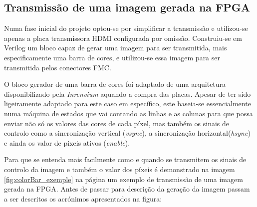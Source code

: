 \subsection{Transmissão de uma imagem gerada na FPGA} \label{subsub:planA}

Numa fase inicial do projeto optou-se por simplificar a transmissão e utilizou-se apenas a placa transmissora HDMI configurada por omissão. Construiu-se em Verilog um bloco capaz de gerar uma imagem para ser transmitida, mais especificamente uma barra de cores, e utilizou-se essa imagem para ser transmitida pelos conectores FMC.

O bloco gerador de uma barra de cores foi adaptado de uma arquitetura disponibilizado pela \textit{Inrenvium} aquando a compra das placas. Apesar de ter sido ligeiramente adaptado para este caso em específico, este baseia-se essencialmente numa máquina de estados que vai contando as linhas e as colunas para que possa enviar não só os valores das cores de cada píxel, mas também os sinais de controlo como a sincronização vertical (\textit{vsync}), a sincronização horizontal(\textit{hsync}) e ainda os valor de pixeis ativos (\textit{enable}).

Para que se entenda mais facilmente como e quando se transmitem os sinais de controlo da imagem e também o valor dos píxeis é demonstrado na imagem \ref{fig:colorBar_exemple} na página \pageref{fig:colorBar_exemple} um exemplo de transmissão de uma imagem gerada na FPGA. Antes de passar para descrição da geração da imagem passam a ser descritos os acrónimos apresentados na figura:

